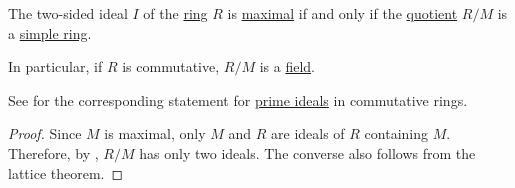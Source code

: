 \begin{corollary}\label{thm:quotient_by_maximal_ideal}
  The two-sided ideal \( I \) of the \hyperref[def:ring]{ring} \( R \) is \hyperref[def:semiring_ideal/maximal]{maximal} if and only if the \hyperref[def:ring/quotient]{quotient} \( R / M \) is a \hyperref[def:simple_object]{simple ring}.
\end{corollary}
\begin{comments}
  \item In particular, if \( R \) is commutative, \( R / M \) is a \hyperref[def:field]{field}.
\end{comments}
\begin{comments}
  \item See  for the corresponding statement for \hyperref[def:semiring_ideal/prime]{prime ideals} in commutative rings.
\end{comments}
\begin{proof}
  Since \( M \) is maximal, only \( M \) and \( R \) are ideals of \( R \) containing \( M \). Therefore, by , \( R / M \) has only two ideals. The converse also follows from the lattice theorem.
\end{proof}

